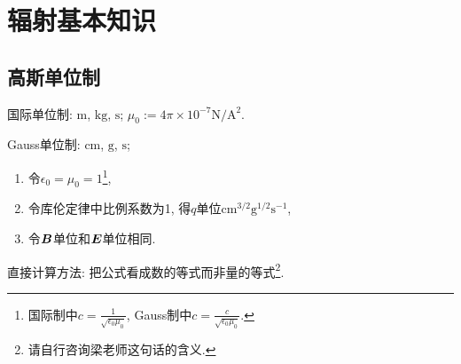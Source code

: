 \chapter{辐射基本知识}

\section{高斯单位制}

国际单位制: $\text{m}$, $\text{kg}$, $\text{s}$; $\mu_0:=4\pi\times10^{-7}\text{N}/\text{A}^2$.

Gauss单位制: $\text{cm}$, $\text{g}$, $\text{s}$;
\begin{enumerate}
    \item 令$\epsilon_0=\mu_0=1$\footnote{国际制中$c=\frac{1}{\sqrt{\epsilon_0\mu_0}}$, Gauss制中$c=\frac{c}{\sqrt{\epsilon_0\mu_0}}$.},
    \item 令库伦定律中比例系数为1, 得$q$单位$\text{cm}^{3/2}\text{g}^{1/2}\text{s}^{-1}$,
    \item 令$\boldsymbol{B}$单位和$\boldsymbol{E}$单位相同.
\end{enumerate}
直接计算方法: 把公式看成数的等式而非量的等式\footnote{请自行咨询梁老师这句话的含义.}.
